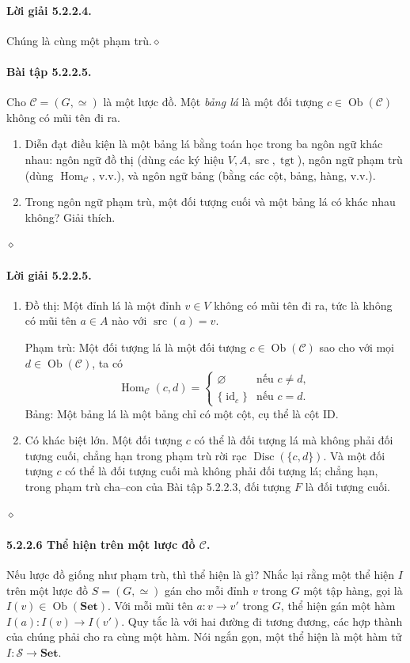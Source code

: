 \paragraph{Lời giải 5.2.2.4.} Chúng là cùng một phạm trù.\hfill$\diamond$
\paragraph{Bài tập 5.2.2.5.} Cho $\mathcal C=(G,\simeq)$ là một lược đồ. Một \emph{bảng lá} là một đối tượng $c\in\operatorname{Ob}(\mathcal C)$ không có mũi tên đi ra.
\begin{enumerate}[label=\alph*.]
\item Diễn đạt điều kiện là một bảng lá bằng toán học trong ba ngôn ngữ khác nhau: ngôn ngữ đồ thị (dùng các ký hiệu $V,A,\operatorname{src},\operatorname{tgt}$), ngôn ngữ phạm trù (dùng $\operatorname{Hom}_{\mathcal C}$, v.v.), và ngôn ngữ bảng (bằng các cột, bảng, hàng, v.v.).
\item Trong ngôn ngữ phạm trù, một đối tượng cuối và một bảng lá có khác nhau không? Giải thích.
\end{enumerate}\hfill$\diamond$
\paragraph{Lời giải 5.2.2.5.}
\begin{enumerate}[label=\alph*.]
\item Đồ thị: Một đỉnh lá là một đỉnh $v\in V$ không có mũi tên đi ra, tức là không có mũi tên $a\in A$ nào với $\operatorname{src}(a)=v$.

Phạm trù: Một đối tượng lá là một đối tượng $c\in\operatorname{Ob}(\mathcal C)$ sao cho với mọi $d\in\operatorname{Ob}(\mathcal C)$, ta có
\[\operatorname{Hom}_{\mathcal C}(c,d)=\begin{cases}\varnothing&\text{nếu }c\ne d,\\\{\operatorname{id}_c\}&\text{nếu }c=d.\end{cases}\]
Bảng: Một bảng lá là một bảng chỉ có một cột, cụ thể là cột ID.
\item Có khác biệt lớn. Một đối tượng $c$ có thể là đối tượng lá mà không phải đối tượng cuối, chẳng hạn trong phạm trù rời rạc $\operatorname{Disc}(\{c,d\})$. Và một đối tượng $c$ có thể là đối tượng cuối mà không phải đối tượng lá; chẳng hạn, trong phạm trù cha--con của Bài tập 5.2.2.3, đối tượng $F$ là đối tượng cuối.
\end{enumerate}\hfill$\diamond$
\paragraph{5.2.2.6 Thể hiện trên một lược đồ $\mathcal C$.} Nếu lược đồ giống như phạm trù, thì thể hiện là gì? Nhắc lại rằng một thể hiện $I$ trên một lược đồ $S=(G,\simeq)$ gán cho mỗi đỉnh $v$ trong $G$ một tập hàng, gọi là $I(v)\in\operatorname{Ob}(\mathbf{Set})$. Với mỗi mũi tên $a:v\to v'$ trong $G$, thể hiện gán một hàm $I(a):I(v)\to I(v')$. Quy tắc là với hai đường đi tương đương, các hợp thành của chúng phải cho ra cùng một hàm. Nói ngắn gọn, một thể hiện là một hàm tử $I:\mathcal S\to\mathbf{Set}$.
